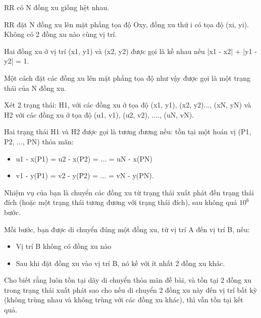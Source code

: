 RR có N đồng xu giống hệt nhau.  

    RR đặt N đồng xu lên mặt phẳng tọa độ Oxy, đồng xu thứ i có tọa độ (xi, yi). Không có 2 đồng xu nào cùng vị trí.   

   Hai đồng xu ở vị trí (x1, y1) và (x2, y2) được gọi là kề nhau nếu |x1 - x2| + |y1 - y2| = 1.  

   Một cách đặt các đồng xu lên mặt phẳng tọa độ như vậy được gọi là một trạng thái của N đồng xu.  

   Xét 2 trạng thái: H1, với các đồng xu ở tọa độ (x1, y1), (x2, y2)..., (xN, yN) và H2 với các đồng xu ở tọa độ (u1, v1), (u2, v2), ...., (uN, vN).  

   Hai trạng thái H1 và H2 được gọi là tương đương nếu: tồn tại một hoán vị (P1, P2, ..., PN) thỏa mãn:  
\begin{itemize}
	\item     u1 - x(P1) = u2 - x(P2) = ... = uN - x(PN)   
	\item     v1 - y(P1) = v2 - y(P2) = ... = vN - y(PN).   
\end{itemize}

   Nhiệm vụ của bạn là chuyển các đồng xu từ trạng thái xuất phát đến trạng thái đích (hoặc một trạng thái tương đương với trạng thái đích), sau không quá $10^{6}$   bước.  

   Mỗi bước, bạn được di chuyển đúng một đồng xu, từ vị trí A đến vị trí B, nếu:  
\begin{itemize}
	\item     Vị trí B không có đồng xu nào   
	\item     Sau khi đặt đồng xu vào vị trí B, nó kề với ít nhất 2 đồng xu khác.   
\end{itemize}

   Cho biết rằng luôn tồn tại dãy di chuyển thỏa mãn đề bài, và tồn tại 2 đồng xu trong trạng thái xuất phát sao cho nếu di chuyển 2 đồng xu này đến vị trí bất kỳ (không trùng nhau và không trùng với các đồng xu khác), thì vẫn tồn tại kết quả.